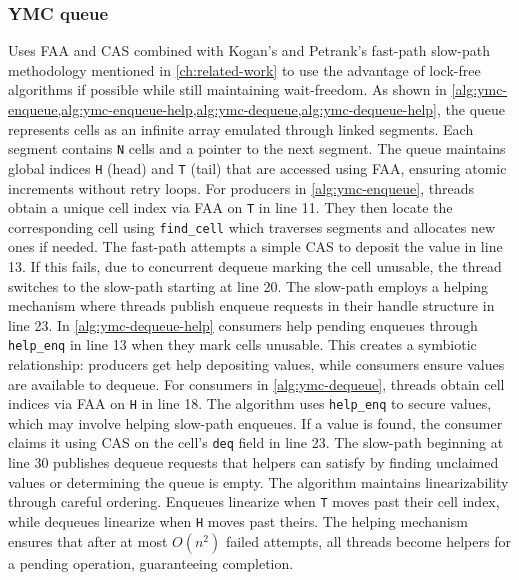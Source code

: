 \subsubsection{\ac{YMC} queue} 
Uses \ac{FAA} and \ac{CAS} combined with Kogan's and Petrank's fast-path slow-path methodology mentioned in \cref{ch:related-work} to use the advantage of lock-free algorithms if possible while still maintaining wait-freedom. As shown in \cref{alg:ymc-enqueue,alg:ymc-enqueue-help,alg:ymc-dequeue,alg:ymc-dequeue-help}, the queue represents cells as an infinite array emulated through linked segments. Each segment contains \texttt{N} cells and a pointer to the next segment. The queue maintains global indices \texttt{H} (head) and \texttt{T} (tail) that are accessed using \ac{FAA}, ensuring atomic increments without retry loops. For producers in \cref{alg:ymc-enqueue}, threads obtain a unique cell index via \ac{FAA} on \texttt{T} in line 11. They then locate the corresponding cell using \texttt{find\_cell} which traverses segments and allocates new ones if needed. The fast-path attempts a simple CAS to deposit the value in line 13. If this fails, due to concurrent dequeue marking the cell unusable, the thread switches to the slow-path starting at line 20. The slow-path employs a helping mechanism where threads publish enqueue requests in their handle structure in line 23. In \cref{alg:ymc-dequeue-help} consumers help pending enqueues through \texttt{help\_enq} in line 13 when they mark cells unusable. This creates a symbiotic relationship: producers get help depositing values, while consumers ensure values are available to dequeue. For consumers in \cref{alg:ymc-dequeue}, threads obtain cell indices via \ac{FAA} on \texttt{H} in line 18. The algorithm uses \texttt{help\_enq} to secure values, which may involve helping slow-path enqueues. If a value is found, the consumer claims it using \ac{CAS} on the cell's \texttt{deq} field in line 23. The slow-path beginning at line 30 publishes dequeue requests that helpers can satisfy by finding unclaimed values or determining the queue is empty. The algorithm maintains linearizability through careful ordering. Enqueues linearize when \texttt{T} moves past their cell index, while dequeues linearize when \texttt{H} moves past theirs. The helping mechanism ensures that after at most $O(n^2)$ failed attempts, all threads become helpers for a pending operation, guaranteeing completion. \cite{FastFetchAndAddWaitFreeQueue}

